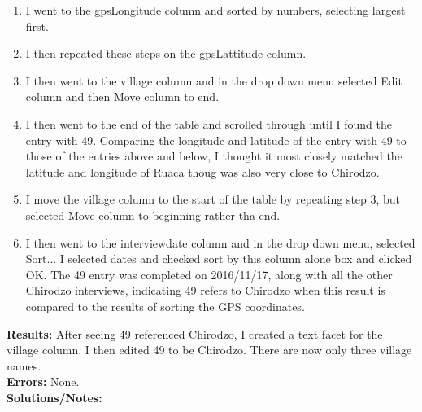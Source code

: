 \documentclass{article}
\begin{document}
\begin{FlushLeft}
\begin{enumerate}
    \item I went to the gps\textunderscore Longitude column and sorted by numbers, selecting largest first.
    \item I then repeated these steps on the gps\textunderscore Lattitude column.
    \item I then went to the village column and in the drop down menu selected Edit column and then Move column to end.
    \item I then went to the end of the table and scrolled through until I found the entry with 49. Comparing the longitude and latitude of the entry with 49 to those of the entries above and below, I thought it most closely matched the latitude and longitude of Ruaca thoug was also very close to Chirodzo.
    \item I move the village column to the start of the table by repeating step 3, but selected Move column to beginning rather tha end.
    \item I then went to the interview\textunderscore date column and in the drop down menu, selected Sort... I selected dates and checked sort by this column alone box and clicked OK. The 49 entry was completed on 2016/11/17, along with all the other Chirodzo interviews, indicating 49 refers to Chirodzo when this result is compared to the results of sorting the GPS coordinates.
\end{enumerate}
\textbf{Results:} After seeing 49 referenced Chirodzo, I created a text facet for the village column. I then edited 49 to be Chirodzo. There are now only three village names.\\
\textbf{Errors:} None.\\
\textbf{Solutions/Notes:}\\


\end{FlushLeft}
\end{document}
